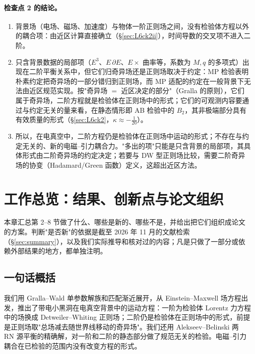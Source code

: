 \documentclass[11pt,a4paper]{ctexart}
\numberwithin{equation}{section}
\begin{document}
\paragraph{检查点 2 的结论。}
\begin{enumerate}
\item 背景场（电场、磁场、加速度）与物体一阶正则场之间，没有检验体方程以外的耦合项：由近区计算直接确立（\S\ref{sec:L6ck2ii}），时间导数的交叉项不进入二阶。
\item 只含背景数据的局部项（$E^3$、$E\,\partial E$、$E\times$ 曲率等，系数为 $M,q$ 的多项式）出现在二阶平衡关系中，但它们归奇异场还是正则场取决于约定：MP 检验表明朴素约定把奇异场的一部分错归到正则场，而 MP 适配的约定在一般背景下无法由近区规范实现。按"奇异场 $=$ 近区决定的部分"（Gralla 的原则），它们属于奇异场，二阶方程就是检验体在正则场中的形式；它们的可观测内容要通过与约定无关的量来看，在静态情形即 AB 检验中的 $B_2$，其非极端部分具有有效质量的形式（\S\ref{sec:L6ck2}，$\kappa\approx-\tfrac1{20}$）。
\item 所以，在电真空中，二阶方程仍是检验体在正则场中运动的形式；不存在与约定无关的、新的电磁--引力耦合力。"多出的项"只能是只含背景的局部项，其具体形式由二阶奇异场的约定决定；若要与 DW 型正则场比较，需要二阶奇异场的协变（Hadamard/Green 函数）定义，这超出近区方法。
\end{enumerate}

\section{工作总览：结果、创新点与论文组织}
\label{sec:overview}

本章汇总第 2--8 节做了什么、哪些是新的、哪些不是，并给出把它们组织成论文的方案。判断"是否新"的依据是截至 2026 年 11 月的文献检索（\S\ref{sec:summary}），以及我们实际推导和核对过的内容；凡是只做了一部分或依赖外部结果的地方，都单独注明。

\subsection{一句话概括}

我们用 Gralla--Wald 单参数解族和匹配渐近展开，从 Einstein--Maxwell 场方程出发，推出了带电小黑洞在电真空背景中的运动方程：一阶为检验体 Lorentz 力方程中的场换成 Detweiler--Whiting 正则场；二阶仍是检验体在正则场中的形式，前提是正则场取"总场减去随世界线移动的奇异场"。我们还用 Alekseev--Belinski 两 RN 源平衡的精确解，对一阶和二阶的静态部分做了规范无关的检验。电磁--引力耦合在已检验的范围内没有改变方程的形式。
\end{document}
